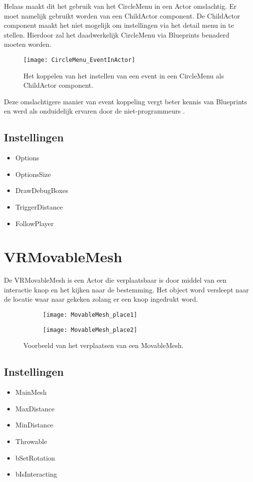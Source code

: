 Helaas maakt dit het gebruik van het CircleMenu in een Actor omslachtig. Er moet namelijk gebruikt worden van een ChildActor component. De ChildActor component maakt het niet mogelijk om instellingen via het detail menu in te stellen. Hierdoor zal het daadwerkelijk CircleMenu via Blueprints benaderd moeten worden.

\begin{figure}[H]
  \centering
    \texttt{[image: CircleMenu\_EventInActor]}
    \caption{Het koppelen van het instellen van een event in een CircleMenu als ChildActor component.}
\end{figure}

Deze omslachtigere manier van event koppeling vergt beter kennis van Blueprints en werd als onduidelijk ervaren door de niet-programmeurs . 

\subsection{Instellingen}
\begin{itemize}
	\item Options
	\item OptionsSize
	\item DrawDebugBoxes
	\item TriggerDistance
	\item FollowPlayer
\end{itemize}

\section{VRMovableMesh}
De VRMovableMesh is een Actor die verplaatsbaar is door middel van een interactie knop en het kijken naar de bestemming. Het object word versleept naar de locatie waar naar gekeken zolang er een knop ingedrukt word.


\begin{figure}[!ht]
  \centering
  	\begin{subfigure}[b]{\linewidth/3}
    	\texttt{[image: MovableMesh\_place1]}
    	\label{fig:a}
	\end{subfigure}

	\begin{subfigure}[b]{\linewidth/3}
    	\texttt{[image: MovableMesh\_place2]}
    	\label{fig:b}
	\end{subfigure}

	\caption{Voorbeeld van het verplaatsen van een MovableMesh.}
\end{figure}

\subsection{Instellingen}

\begin{itemize}
	\item MainMesh
	\item MaxDistance
	\item MinDistance
	\item Throwable
	\item bSetRotation
	\item bIsInteracting
\end{itemize}